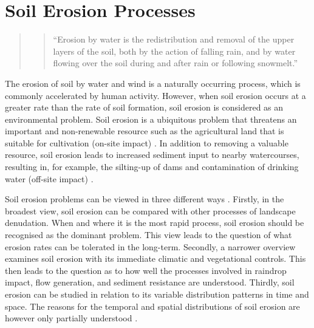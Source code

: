 \section{Soil Erosion Processes}
\label{sec:SoilErosionProcesses}


\begin{quote}
  \begin{quote}
    ``Erosion by water is the redistribution and removal of the
upper layers of the soil, both by the action of falling rain, and by water
flowing over the soil during and after rain or following snowmelt.''
\citep{favis-mortlock2002-452}
  \end{quote}
\end{quote}

The erosion of soil by water and wind is a naturally occurring process, which is
commonly accelerated by human activity. However, when soil erosion occurs at a
greater rate than the rate of soil formation, soil erosion is considered as an
environmental problem. Soil erosion is a ubiquitous problem that threatens an
important and non-renewable resource such as the agricultural land that is
suitable for cultivation (on-site impact) \citep{boardman2003-176}. In addition
to removing a valuable resource, soil erosion leads to increased sediment input
to nearby watercourses, resulting in, for example, the silting-up of dams and
contamination of drinking water (off-site impact)
\citep{mejia1994-331,kitchen1998-179}.

Soil erosion problems can be viewed in three different ways
\citep{kirkby1980-312}. Firstly, in the broadest view, soil erosion can be
compared with other processes of landscape denudation. When and where it is the
most rapid process, soil erosion should be recognised as the dominant problem.
This view leads to the question of what erosion rates can be tolerated in the
long-term. Secondly, a narrower overview examines soil erosion with its
immediate climatic and vegetational controls. This then leads to the question as
to how well the processes involved in raindrop impact, flow generation, and
sediment resistance are understood. Thirdly, soil erosion can be studied in
relation to its variable distribution patterns in time and space. The reasons
for the temporal and spatial distributions of soil erosion are however only
partially understood \citep{quine2002-55,gomez2005-143,wakiyama2010-993}.

